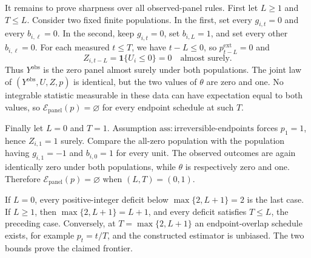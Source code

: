 It remains to prove sharpness over all observed-panel rules.  First let \(L\ge1\) and \(T\le L\).  Consider two fixed finite populations.  In the first, set every \(g_{i,t}=0\) and every \(b_{i,\ell}=0\).  In the second, keep \(g_{i,t}=0\), set \(b_{i,L}=1\), and set every other \(b_{i,\ell}=0\).  For each measured \(t\le T\), we have \(t-L\le0\), so \(p_{t-L}^{\mathrm{ext}}=0\) and
\[
 Z_{i,t-L}=\mathbf 1\{U_i\le0\}=0
 \quad\text{almost surely}.
\]
Thus \(Y^{\mathrm{obs}}\) is the zero panel almost surely under both populations.  The joint law of \((Y^{\mathrm{obs}},U,Z,p)\) is identical, but the two values of \(\theta\) are zero and one.  No integrable statistic measurable in these data can have expectation equal to both values, so \(\mathcal E_{\mathrm{panel}}(p)=\varnothing\) for every endpoint schedule at such \(T\).

Finally let \(L=0\) and \(T=1\).  Assumption \(\mathrm{ass:irreversible\text{-}endpoints}\) forces \(p_1=1\), hence \(Z_{i,1}=1\) surely.  Compare the all-zero population with the population having \(g_{i,1}=-1\) and \(b_{i,0}=1\) for every unit.  The observed outcomes are again identically zero under both populations, while \(\theta\) is respectively zero and one.  Therefore \(\mathcal E_{\mathrm{panel}}(p)=\varnothing\) when \((L,T)=(0,1)\).

If \(L=0\), every positive-integer deficit below \(\max\{2,L+1\}=2\) is the last case.  If \(L\ge1\), then \(\max\{2,L+1\}=L+1\), and every deficit satisfies \(T\le L\), the preceding case.  Conversely, at \(T=\max\{2,L+1\}\) an endpoint-overlap schedule exists, for example \(p_t=t/T\), and the constructed estimator is unbiased.  The two bounds prove the claimed frontier.